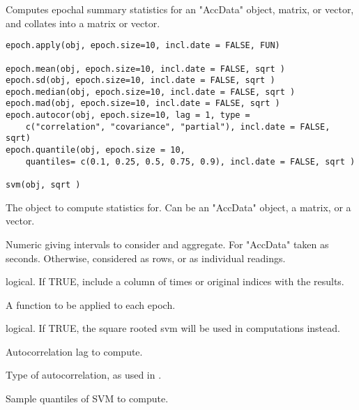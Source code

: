\documentclass[a4paper]{book}
\begin{document}
%
\begin{Description}\relax
Computes epochal summary statistics for an "AccData" object, matrix, or vector, and collates into a matrix or vector.
\end{Description}
%
\begin{Usage}
\begin{verbatim}
epoch.apply(obj, epoch.size=10, incl.date = FALSE, FUN)

epoch.mean(obj, epoch.size=10, incl.date = FALSE, sqrt )
epoch.sd(obj, epoch.size=10, incl.date = FALSE, sqrt )
epoch.median(obj, epoch.size=10, incl.date = FALSE, sqrt )
epoch.mad(obj, epoch.size=10, incl.date = FALSE, sqrt )
epoch.autocor(obj, epoch.size=10, lag = 1, type = 
    c("correlation", "covariance", "partial"), incl.date = FALSE, sqrt)
epoch.quantile(obj, epoch.size = 10, 
    quantiles= c(0.1, 0.25, 0.5, 0.75, 0.9), incl.date = FALSE, sqrt )

svm(obj, sqrt )
\end{verbatim}
\end{Usage}
%
\begin{Arguments}
\begin{ldescription}
\item[\code{obj}] The object to compute statistics for. Can be an "AccData" object, a matrix, or a vector.
\item[\code{epoch.size}] Numeric giving intervals to consider and aggregate. For "AccData"  taken as seconds. Otherwise, considered as rows, or as individual readings.
\item[\code{incl.date}] logical. If TRUE, include a column of times or original indices with the results.
\item[\code{FUN}] A function to be applied to each epoch.
\item[\code{sqrt}] logical. If TRUE, the square rooted svm will be used in computations instead.
\item[\code{lag}] Autocorrelation lag to compute.
\item[\code{type}] Type of autocorrelation, as used in .
\item[\code{quantiles}] Sample quantiles of SVM to compute.
\end{ldescription}
\end{Arguments}
\end{document}
